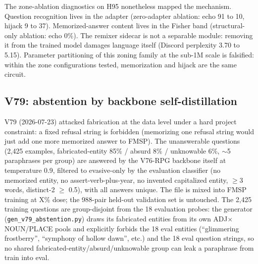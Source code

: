 \documentclass[11pt]{article}
\begin{document}
The zone-ablation diagnostics on H95 nonetheless mapped the mechanism. Question recognition lives in the adapter (zero-adapter ablation: echo 91 to 10, hijack 9 to 37). Memorized-answer content lives in the Fisher band (structural-only ablation: echo 0\%). The remixer sidecar is not a separable module: removing it from the trained model damages language itself (Discord perplexity 3.70 to 5.15). Parameter partitioning of this zoning family at the sub-1M scale is falsified: within the zone configurations tested, memorization and hijack are the same circuit.

\subsection{V79: abstention by backbone self-distillation}

V79 (2026-07-23) attacked fabrication at the data level under a hard project constraint: a fixed refusal string is forbidden (memorizing one refusal string would just add one more memorized answer to FMSP). The unanswerable questions (2{,}425 examples, fabricated-entity 85\% / absurd 8\% / unknowable 6\%, $\sim$5 paraphrases per group) are answered by the V76-RPG backbone itself at temperature 0.9, filtered to evasive-only by the evaluation classifier (no memorized entity, no assert-verb-plus-year, no invented capitalized entity, $\geq$3 words, distinct-2 $\geq$ 0.5), with all answers unique. The file is mixed into FMSP training at X\% dose; the 988-pair held-out validation set is untouched. The 2{,}425 training questions are group-disjoint from the 18 evaluation probes: the generator (\texttt{gen\_v79\_abstention.py}) draws its fabricated entities from its own ADJ$\times$NOUN/PLACE pools and explicitly forbids the 18 eval entities (``glimmering frostberry'', ``symphony of hollow dawn'', etc.) and the 18 eval question strings, so no shared fabricated-entity/absurd/unknowable group can leak a paraphrase from train into eval.
\end{document}
